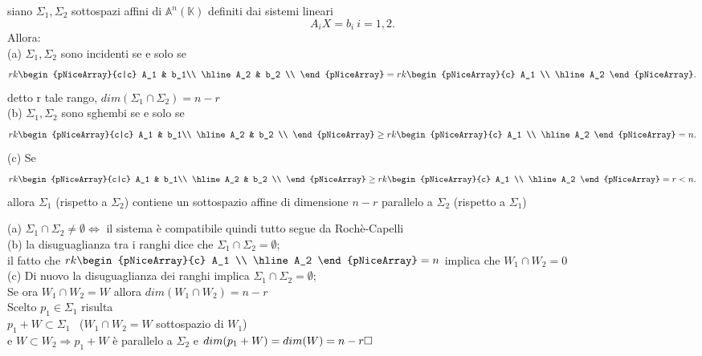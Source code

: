 \documentclass[12px]{article}
\begin{document}
\newpage
\begin{prop}
	siano $\Sigma_1, \Sigma_2$ sottospazi affini di $\mathbb{A}^n(\mathbb{K})$ definiti dai sistemi lineari \[
	A_iX = b_i \ i = 1,2
	.\]
	Allora:\\
	(a) $\Sigma_1, \Sigma_2$ sono incidenti se e solo se \[
		rk\begin{pNiceArray}{c|c}
			A_1 & b_1\\
			\hline
			A_2 & b_2 \\
			\end{pNiceArray} = rk \begin{pNiceArray}{c}
				A_1 \\
				\hline
				A_2
			\end{pNiceArray}
	.\] 
	detto r tale rango, $dim(\Sigma_1\cap\Sigma_2) = n-r$\\
	(b) $\Sigma_1, \Sigma_2$ sono sghembi se e solo se \[
		rk\begin{pNiceArray}{c|c}
			A_1 & b_1\\
			\hline
			A_2 & b_2 \\
			\end{pNiceArray} \geq rk \begin{pNiceArray}{c}
				A_1 \\
				\hline
				A_2
			\end{pNiceArray} = n
	.\] 
	(c) Se\[
		rk\begin{pNiceArray}{c|c}
			A_1 & b_1\\
			\hline
			A_2 & b_2 \\
			\end{pNiceArray} \geq rk \begin{pNiceArray}{c}
				A_1 \\
				\hline
				A_2
			\end{pNiceArray} = r < n
	.\] 
	allora $\Sigma_1$ (rispetto a $\Sigma_2$) contiene un sottospazio affine di dimensione $n-r$ parallelo a $\Sigma_2$ (rispetto a $\Sigma_1$)
\end{prop}
\begin{dimo}
	(a) $\Sigma_1 \cap\Sigma_2 \neq \emptyset \Leftrightarrow$ il  sistema è compatibile quindi tutto segue da Rochè-Capelli\\[10px]
	(b) la disuguaglianza tra i ranghi dice che $\Sigma_1\cap\Sigma_2 = \emptyset$;\\ il fatto che $rk \begin{pNiceArray}{c}
		A_1 \\
		\hline
		A_2
	\end{pNiceArray} = n$ implica che $W_1\cap W_2 = {0}$\\
(c) Di nuovo la disuguaglianza dei  ranghi implica $\Sigma_1\cap\Sigma_2 = \emptyset$;\\
Se ora $W_1\cap W_2 = W$ allora $dim(W_1\cap W_2) = n - r$\\
Scelto $p_1 \in \Sigma_1$ risulta\\
$p_1 + W \subset\Sigma_1$ \ ($W_1 \cap W_2 = W$ sottospazio di $W_1$)\\
e $W \subset W_2 \Rightarrow p_1 + W$ è parallelo a $\Sigma_2$ e $dim(p_1 + W) = dim(W) = n - r \hfill\square$
\end{dimo}
\end{document}
